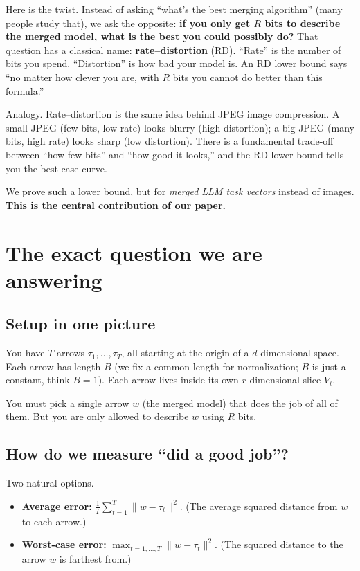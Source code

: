 \documentclass[11pt]{article}
\begin{document}
Here is the twist. Instead of asking ``what's the best merging
algorithm'' (many people study that), we ask the opposite: \textbf{if
you only get $R$ bits to describe the merged model, what is the best
you could possibly do?} That question has a classical name:
\textbf{rate--distortion} (RD). ``Rate'' is the number of bits you
spend. ``Distortion'' is how bad your model is. An RD lower bound says
``no matter how clever you are, with $R$ bits you cannot do better than
this formula.''

Analogy. Rate--distortion is the same idea behind JPEG image
compression. A small JPEG (few bits, low rate) looks blurry (high
distortion); a big JPEG (many bits, high rate) looks sharp (low
distortion). There is a fundamental trade-off between ``how few bits''
and ``how good it looks,'' and the RD lower bound tells you the
best-case curve.

We prove such a lower bound, but for \emph{merged LLM task vectors}
instead of images. \textbf{This is the central contribution of our
paper.}

\section{The exact question we are answering}

\subsection{Setup in one picture}

You have $T$ arrows $\tau_1,\dots,\tau_T$, all starting at the origin
of a $d$-dimensional space. Each arrow has length $B$ (we fix a common
length for normalization; $B$ is just a constant, think $B=1$). Each
arrow lives inside its own $r$-dimensional slice $V_t$.

You must pick a single arrow $w$ (the merged model) that does the job
of all of them. But you are only allowed to describe $w$ using $R$
bits.

\subsection{How do we measure ``did a good job''?}

Two natural options.
\begin{itemize}[nosep]
  \item \textbf{Average error:} $\frac{1}{T}\sum_{t=1}^T \|w - \tau_t\|^2$.
        (The average squared distance from $w$ to each arrow.)
  \item \textbf{Worst-case error:} $\max_{t=1,\dots,T}\|w - \tau_t\|^2$.
        (The squared distance to the arrow $w$ is farthest from.)
\end{itemize}
\end{document}

